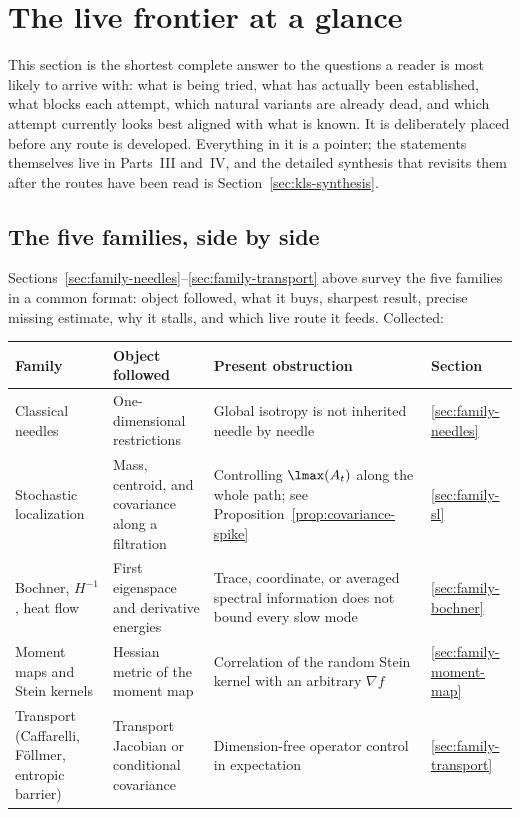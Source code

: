 \documentclass[../../main.tex]{subfiles}
\begin{document}
\section{The live frontier at a glance}
\label{sec:frontier-atlas}

This section is the shortest complete answer to the questions a reader is most likely to arrive
with: what is being tried, what has actually been established, what blocks each attempt, which
natural variants are already dead, and which attempt currently looks best aligned with what is
known. It is deliberately placed before any route is developed. Everything in it is a pointer;
the statements themselves live in Parts~III and~IV, and the detailed synthesis that revisits them
after the routes have been read is Section~\ref{sec:kls-synthesis}.

\subsection{The five families, side by side}
\label{subsec:kls-reading-map}
\label{sec:kls-strategy-map}

Sections~\ref{sec:family-needles}--\ref{sec:family-transport} above survey the five families in
a common format: object followed, what it buys, sharpest result, precise missing estimate, why it
stalls, and which live route it feeds. Collected:

\begin{center}
\begin{tabularx}{\textwidth}{@{}>{\raggedright\arraybackslash}p{}>{\raggedright\arraybackslash}p{}Y>{\raggedright\arraybackslash}p{0.13\textwidth}@{}}
\toprule
Family & Object followed & Present obstruction & Section \\
\midrule
Classical needles & One-dimensional restrictions & Global isotropy is not inherited needle by
needle & \ref{sec:family-needles} \\
\addlinespace
Stochastic localization & Mass, centroid, and covariance along a filtration & Controlling
$\lmax(A_t)$ along the whole path; see Proposition~\ref{prop:covariance-spike} &
\ref{sec:family-sl} \\
\addlinespace
Bochner, $H^{-1}$, heat flow & First eigenspace and derivative energies & Trace, coordinate, or
averaged spectral information does not bound every slow mode & \ref{sec:family-bochner} \\
\addlinespace
Moment maps and Stein kernels & Hessian metric of the moment map & Correlation of the random
Stein kernel with an arbitrary $\nabla f$ & \ref{sec:family-moment-map} \\
\addlinespace
Transport (Caffarelli, F\"ollmer, entropic barrier) & Transport Jacobian or conditional
covariance & Dimension-free operator control in expectation & \ref{sec:family-transport} \\
\bottomrule
\end{tabularx}
\end{center}
\end{document}
